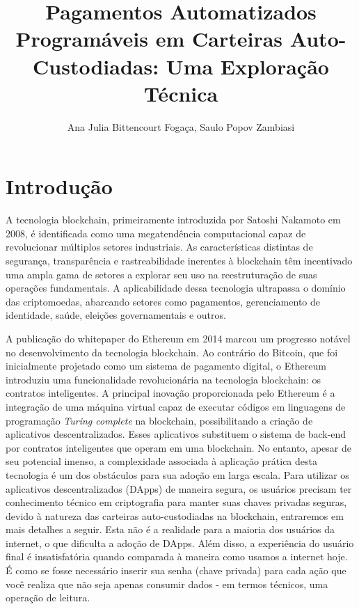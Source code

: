 \documentclass[12pt]{article}
\title{Pagamentos Automatizados Programáveis em Carteiras Auto-Custodiadas: Uma Exploração Técnica}
\author{Ana Julia Bittencourt Fogaça\inst{1}, Saulo Popov Zambiasi\inst{2} }
\begin{document}
\maketitle

\begin{abstract}
\end{abstract}

\section{Introdução}
A tecnologia blockchain, primeiramente introduzida por Satoshi Nakamoto em 2008, é identificada
como uma megatendência computacional capaz de revolucionar múltiplos setores industriais\cite{1}.
As características distintas de segurança, transparência e rastreabilidade inerentes à blockchain
têm incentivado uma ampla gama de setores a explorar seu uso na reestruturação de suas operações
fundamentais. A aplicabilidade dessa tecnologia ultrapassa o domínio das criptomoedas, abarcando
setores como pagamentos, gerenciamento de identidade, saúde, eleições governamentais e
outros\cite{2}.

A publicação do whitepaper do Ethereum em 2014 marcou um progresso notável no desenvolvimento da
tecnologia blockchain\cite{3}. Ao contrário do Bitcoin, que foi inicialmente projetado como um
sistema de pagamento digital, o Ethereum introduziu uma funcionalidade revolucionária na tecnologia
blockchain: os contratos inteligentes. A principal inovação proporcionada pelo Ethereum é a
integração de uma máquina virtual capaz de executar códigos em linguagens de programação
\textit{Turing complete} na blockchain, possibilitando a criação de aplicativos descentralizados.
Esses aplicativos substituem o sistema de back-end por contratos inteligentes que operam em uma
blockchain\cite{7}. No entanto, apesar de seu potencial imenso, a complexidade associada à
aplicação prática desta tecnologia é um dos obstáculos para sua adoção em larga escala\cite{11}.
Para utilizar os aplicativos descentralizados (DApps) de maneira segura, os usuários precisam ter
conhecimento técnico em criptografia para manter suas chaves privadas seguras\cite{6}, devido à
natureza das carteiras auto-custodiadas na blockchain, entraremos em mais detalhes a seguir. Esta
não é a realidade para a maioria dos usuários da internet, o que dificulta a adoção de DApps. Além
disso, a experiência do usuário final é insatisfatória quando comparada à maneira como usamos a
internet hoje. É como se fosse necessário inserir sua senha (chave privada) para cada ação que você
realiza que não seja apenas consumir dados - em termos técnicos, uma operação de leitura.
\end{document}
